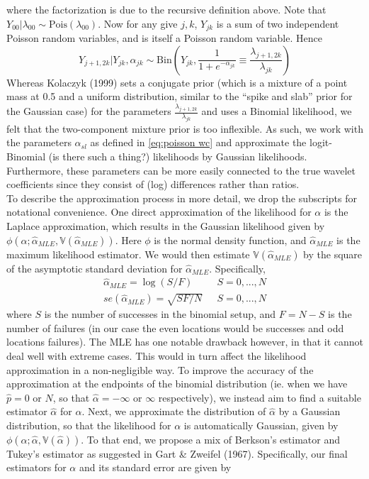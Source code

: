 \documentclass[12pt]{article}
\newcommand{\Ga}{\alpha}
\newcommand{\Gl}{\lambda}    \newcommand{\GL}{\Lambda}
\begin{document}
where the factorization is due to the recursive definition above. Note that $Y_{00}|\Gl_{00}\sim \textrm{Pois}(\Gl_{00})$. Now for any give $j,k$, $Y_{jk}$ is a sum of two independent Poisson random variables, and is itself a Poisson random variable. Hence
\[Y_{j+1,2k}|Y_{jk},\Ga_{jk}\sim \textrm{Bin}({Y_{jk},\frac{1}{1+e^{-\Ga_{jk}}}\equiv\frac{\Gl_{j+1,2k}}{\Gl_{jk}}})\]
Whereas Kolaczyk (1999) sets a conjugate prior (which is a mixture of a point mass at 0.5 and a uniform distribution, similar to the ``spike and slab'' prior for the Gaussian case) for the parameters $\frac{\Gl_{j+1,2k}}{\Gl_{jk}}$ and uses a Binomial likelihood, we felt that the two-component mixture prior is too inflexible. As such, we work with the parameters $\Ga_{sl}$ as defined in \eqref{eq:poisson wc} and approximate the logit-Binomial (is there such a thing?) likelihoods by Gaussian likelihoods. Furthermore, these parameters can be more easily connected to the true wavelet coefficients since they consist of (log) differences rather than ratios.\bigskip\\
To describe the approximation process in more detail, we drop the subscripts for notational convenience. One direct approximation of the likelihood for $\Ga$ is the Laplace approximation, which results in the Gaussian likelihood given by $\phi(\Ga;\hat{\Ga}_{MLE},\mathbb{V}(\hat{\Ga}_{MLE}))$. Here $\phi$ is the normal density function, and $\hat{\Ga}_{MLE}$ is the maximum likelihood estimator. We would then estimate $\mathbb{V}(\hat{\Ga}_{MLE})$ by the square of the asymptotic standard deviation for $\hat{\Ga}_{MLE}$. Specifically,
\begin{eqnarray}
\hat{\Ga}_{MLE}=\log(S/F)&\ \ \ S=0,...,N\\
se(\hat{\Ga}_{MLE})=\sqrt{SF/N}&\ \ \ S=0,...,N
\end{eqnarray}
where $S$ is the number of successes in the binomial setup, and $F=N-S$ is the number of failures (in our case the even locations would be successes and odd locations failures). The MLE has one notable drawback however, in that it cannot deal well with extreme cases. This would in turn affect the likelihood approximation in a non-negligible way. To improve the accuracy of the approximation at the endpoints of the binomial distribution (ie. when we have $\hat{p}=0$ or $N$, so that $\hat{\Ga}=-\infty$ or $\infty$ respectively), we instead aim to find a suitable estimator $\hat{\Ga}$ for $\Ga$. Next, we approximate the distribution of $\hat{\Ga}$ by a Gaussian distribution, so that the likelihood for $\Ga$ is automatically Gaussian, given by $\phi(\Ga;\hat{\Ga},\mathbb{V}(\hat{\Ga}))$. To that end, we propose a mix of Berkson's estimator and Tukey's estimator as suggested in Gart \& Zweifel (1967). Specifically, our final estimators for $\Ga$ and its standard error are given by
\end{document}

